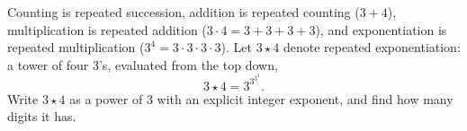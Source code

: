 Counting is repeated succession, addition is repeated counting ($3+4$), multiplication is repeated addition ($3\cdot4=3+3+3+3$), and exponentiation is repeated multiplication ($3^4=3\cdot3\cdot3\cdot3$). Let $3\star4$ denote repeated exponentiation: a tower of four $3$'s, evaluated from the top down,
\[
3\star4=3^{3^{3^{3}}}.
\]
Write $3\star4$ as a power of $3$ with an explicit integer exponent, and find how many digits it has.
